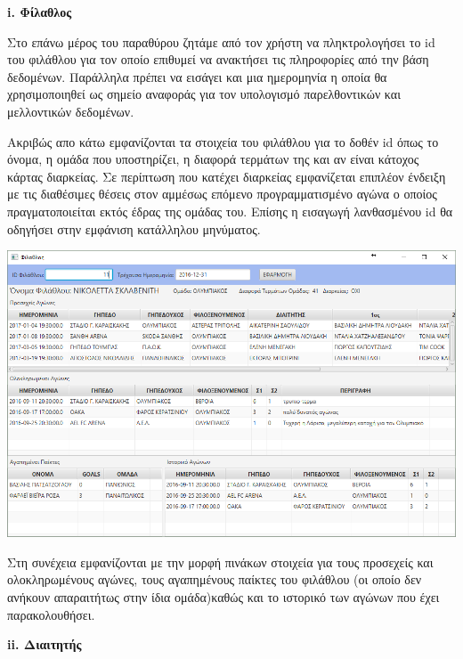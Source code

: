 \documentclass[a4paper,oneside,titlepage,11pt]{article}
\begin{document}
\vspace{0.3cm}

\noindent\textbf{i. Φίλαθλος} 
\vspace{0.3cm}

\noindent Στο επάνω μέρος του παραθύρου ζητάμε από τον χρήστη να πληκτρολογήσει το id του φιλάθλου για τον οποίο επιθυμεί να ανακτήσει τις πληροφορίες από την βάση δεδομένων. Παράλληλα πρέπει να εισάγει και μια ημερομηνία η οποία θα χρησιμοποιηθεί ως σημείο αναφοράς για τον υπολογισμό παρελθοντικών και μελλοντικών δεδομένων. 
\vspace{0.3cm}

\noindent Ακριβώς απο κάτω εμφανίζονται τα στοιχεία του φιλάθλου για το δοθέν id όπως το όνομα, η ομάδα που υποστηρίζει, η διαφορά τερμάτων της και αν είναι κάτοχος κάρτας διαρκείας. Σε περίπτωση που κατέχει διαρκείας εμφανίζεται επιπλέον ένδειξη με τις διαθέσιμες θέσεις στον αμμέσως επόμενο προγραμματισμένο αγώνα ο οποίος πραγματοποιείται εκτός έδρας της ομάδας του. Επίσης η εισαγωγή λανθασμένου id θα οδηγήσει στην εμφάνιση κατάλληλου μηνύματος.

\begin{center}
 \includegraphics[scale=0.6]{screens/2_fan.PNG} 
\end{center} 

\noindent Στη συνέχεια εμφανίζονται με την μορφή πινάκων στοιχεία για τους προσεχείς και ολοκληρωμένους αγώνες, τους αγαπημένους παίκτες του φιλάθλου (οι οποίο δεν ανήκουν απαραιτήτως στην ίδια ομάδα)καθώς και το ιστορικό των αγώνων που έχει παρακολουθήσει. 

\vspace{0.3cm}

\noindent\textbf{ii. Διαιτητής} 
\end{document}
